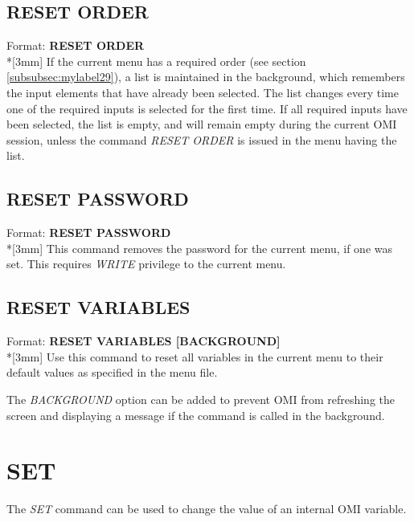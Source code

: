 \documentclass[a4paper]{book}
\renewcommand{\indent}{\hspace*{5mm}}
\begin{document}
\subsection{RESET ORDER}
\label{subsubsec:mylabel72}

\indent Format: \textbf{RESET ORDER}\\*[3mm]
If the current menu has a required order (see section 
\ref{subsubsec:mylabel29}), a list is maintained in the background, 
which remembers the input elements that have already been selected. The list 
changes every time one of the required inputs is selected for the first 
time. If all required inputs have been selected, the list is empty, and will 
remain empty during the current OMI session, unless the command \textsl{RESET ORDER} 
is issued in the menu having the list.

\subsection{RESET PASSWORD}
\label{subsubsec:mylabel73}

\indent Format: \textbf{RESET PASSWORD}\dag\\*[3mm]
This command removes the password for the current menu, if one was set. This 
requires \textsl{WRITE} privilege to the current menu.

\subsection{RESET VARIABLES}
\label{subsubsec:resetvar}

\indent Format: \textbf{RESET VARIABLES [BACKGROUND]}\\*[3mm]
Use this command to reset all variables in the current menu to
their default values as specified in the menu file.

The \textsl{BACKGROUND} option can be added to prevent OMI from refreshing the
screen and displaying a message if the command is called in the background.

\section{SET}
\label{subsec:mylabel20}

The \textsl{SET} command can be used to change the value of an internal OMI variable.
\end{document}
